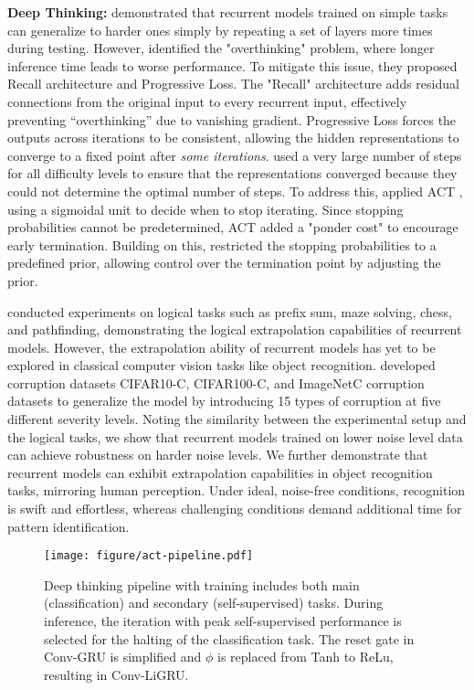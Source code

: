 \textbf{Deep Thinking:} 
\citet{schwarzschild2021can} demonstrated that recurrent models trained on simple tasks can generalize to harder ones simply by repeating a set of layers more times during testing. 
However, \citet{bansal2022endtoend} identified the "overthinking" problem, where longer inference time leads to worse performance.
To mitigate this issue, they proposed Recall architecture and Progressive Loss. 
The "Recall" architecture adds residual connections from the original input to every recurrent input, effectively preventing ``overthinking'' due to vanishing gradient.
Progressive Loss forces the outputs across iterations to be consistent, allowing the hidden representations to converge to a fixed point after \textit{some iterations}. 
\citet{bansal2022endtoend} used a very large number of steps for all difficulty levels to ensure that the representations converged because they could not determine the optimal number of steps.
To address this, \citet{veerabadran2023Adaptive,Ballas2016Iclr} applied ACT \cite{Graves2016AdaptiveComutationTime}, using a sigmoidal unit to decide when to stop iterating. 
Since stopping probabilities cannot be predetermined, ACT added a "ponder cost" to encourage early termination. 
Building on this, \citet{PonderNet} restricted the stopping probabilities to a predefined prior, allowing control over the termination point by adjusting the prior.

\citet{schwarzschild2021can, bansal2022endtoend,veerabadran2023Adaptive} conducted experiments on logical tasks such as prefix sum, maze solving, chess, and pathfinding, demonstrating the logical extrapolation capabilities of recurrent models. 
However, the extrapolation ability of recurrent models has yet to be explored in classical computer vision tasks like object recognition.
\citet{cifarC} developed corruption datasets CIFAR10-C, CIFAR100-C, and ImageNetC corruption datasets to generalize the model by introducing 15 types of corruption at five different severity levels.
Noting the similarity between the experimental setup and the logical tasks, we show that recurrent models trained on lower noise level data can achieve robustness on harder noise levels. 
We further demonstrate that recurrent models can exhibit extrapolation capabilities in object recognition tasks, mirroring human perception. Under ideal, noise-free conditions, recognition is swift and effortless, whereas challenging conditions demand additional time for pattern identification.

\begin{figure}[!t]
    \centering
    \texttt{[image: figure/act-pipeline.pdf]}
    \caption{Deep thinking pipeline with training includes both main (classification) and secondary (self-supervised) tasks. 
    During inference, the iteration with peak self-supervised performance is selected for the halting of the classification task. 
    The reset gate in Conv-GRU is simplified and $\phi$ is replaced from Tanh to ReLu, resulting in Conv-LiGRU.}
    \label{fig:enter-label}
\end{figure}